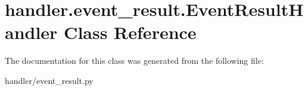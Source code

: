 \hypertarget{classhandler_1_1event__result_1_1_event_result_handler}{}\section{handler.\+event\+\_\+result.\+Event\+Result\+Handler Class Reference}
\label{classhandler_1_1event__result_1_1_event_result_handler}


The documentation for this class was generated from the following file\+:\begin{DoxyCompactItemize}
\item 
handler/event\+\_\+result.\+py\end{DoxyCompactItemize}
